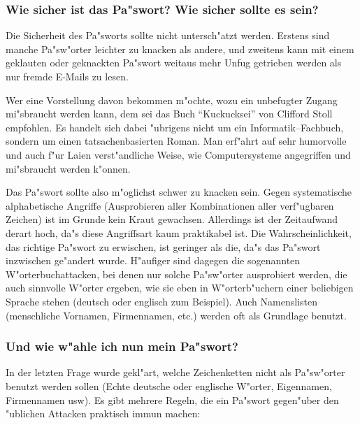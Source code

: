
\subsubsection*{Wie sicher ist das Pa"swort? Wie sicher sollte es sein?}

Die Sicherheit des Pa"sworts sollte nicht untersch"atzt werden. Erstens sind
manche Pa"sw"orter leichter zu knacken als andere, und zweitens kann mit einem
geklauten oder geknackten Pa"swort weitaus mehr Unfug getrieben werden als nur
fremde \glossar E-Mails zu lesen.

Wer eine Vorstellung davon bekommen m"ochte, wozu ein unbefugter Zugang
mi"sbraucht werden kann, dem sei das Buch "`Kuckucksei"' von Clifford Stoll
empfohlen. Es handelt sich dabei "ubrigens nicht um ein Informatik--Fachbuch,
sondern um einen tatsachenbasierten Roman. Man erf"ahrt auf sehr humorvolle und
auch f"ur Laien verst"andliche Weise, wie Computersysteme angegriffen und
mi"sbraucht werden k"onnen. 

Das Pa"swort sollte also m"oglichst schwer zu knacken sein. Gegen systematische
alphabetische Angriffe (Ausprobieren aller Kombinationen aller verf"ugbaren
Zeichen) ist im Grunde kein Kraut gewachsen. Allerdings ist der Zeitaufwand
derart hoch, da"s diese Angriffsart kaum praktikabel ist. Die
Wahrscheinlichkeit, das richtige Pa"swort zu erwischen, ist geringer als die,
da"s das Pa"swort inzwischen ge"andert wurde. H"aufiger sind dagegen die
sogenannten W"orterbuchattacken, bei denen nur solche Pa"sw"orter ausprobiert
werden, die auch sinnvolle W"orter ergeben, wie sie eben in W"orterb"uchern einer
beliebigen Sprache stehen (deutsch oder englisch zum Beispiel). Auch
Namenslisten (menschliche Vornamen, Firmennamen, etc.) werden oft als
Grundlage benutzt.

\subsubsection*{Und wie w"ahle ich nun mein Pa"swort?}

In der letzten Frage wurde gekl"art, welche Zeichenketten nicht als Pa"sw"orter
benutzt werden sollen (Echte deutsche oder englische W"orter, Eigennamen,
Firmennamen usw). Es gibt mehrere Regeln, die ein Pa"swort gegen"uber den
"ublichen Attacken praktisch immun machen: 

